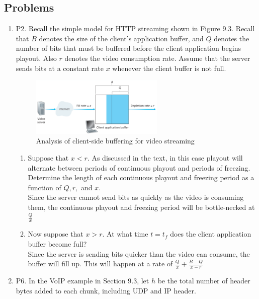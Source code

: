 \documentclass[12pt]{article}
\begin{document}
\subsection*{Problems}
\begin{enumerate}
	\item P2. Recall the simple model for HTTP streaming shown in Figure 9.3. Recall that \(B\) denotes the size of the client’s application buffer, and \(Q\) denotes the number of bits that must be buffered before the client application begins playout. Also \(r\) denotes the video consumption rate. Assume that the server sends bits at a constant rate \(x\) whenever the client buffer is not full.
	\setcounter{figure}{2}
	\begin{figure}[h!]
	\centering
	\includegraphics[width=0.6\textwidth]{./Images/Fig09-003.png}
	\caption{Analysis of client-side buffering for video streaming}
	\end{figure}
		\begin{enumerate}
			\item Suppose that \(x<r\). As discussed in the text, in this case playout will alternate between periods of continuous playout and periods of freezing. Determine the length of each continuous playout and freezing period as a function of \(Q, r, \) and \(x\).\\[1em]
			\color{CrispBlue}
			Since the server cannot send bits as quickly as the video is consuming them, the continuous playout and freezing period will be bottle-necked at \(\displaystyle\frac{Q}{x}\)\color{black}
			\item Now suppose that \(x>r\). At what time \(t=t_f\) does the client application buffer become full?\\[1em]
			\color{CrispBlue}
			Since the server is sending bits quicker than the video can consume, the buffer will fill up. This will happen at a rate of \(\displaystyle\frac{Q}{x}+\displaystyle\frac{B-Q}{x-r}\)\color{black}
		\end{enumerate}
	\item P6. In the VoIP example in Section 9.3, let \(h\) be the total number of header bytes added to each chunk, including UDP and IP header.\par

\end{enumerate}
\end{document}
